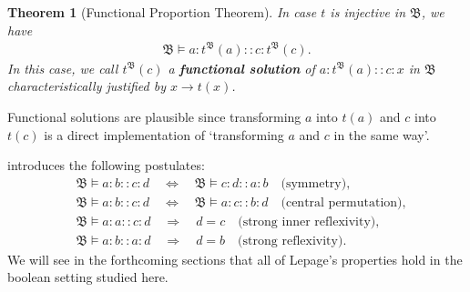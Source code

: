 \documentclass[11pt]{amsart}
\newtheorem{theorem}{Theorem}
\theoremstyle{definition} %
\begin{document}
\begin{theorem}[Functional Proportion Theorem]\label{t:FPT} In case $t$ is injective in $\mathfrak B$, we have
\begin{align*} 
	\mathfrak B\models a: t^\mathfrak B(a)::c: t^\mathfrak B(c).
\end{align*} In this case, we call $ t^\mathfrak B(c)$ a \textit{\textbf{functional solution}} of $a: t^\mathfrak B(a)::c:x$ in $\mathfrak B$ characteristically justified by $x\to t(x)$.
\end{theorem}

Functional solutions are plausible since transforming $a$ into $ t(a)$ and $c$ into $ t(c)$ is a direct implementation of `transforming $a$ and $c$ in the same way'.


 introduces the following postulates:
\begin{align}
	&\mathfrak B\models a:b::c:d\quad\Leftrightarrow\quad \mathfrak B\models c:d::a:b\quad\text{(symmetry)},\\
	\label{equ:central_permutation} &\mathfrak B\models a:b::c:d\quad\Leftrightarrow\quad \mathfrak B\models a:c::b:d\quad\text{(central permutation)},\\
	\label{equ:strong_inner_reflexivity} &\mathfrak B\models a:a::c:d\quad\Rightarrow\quad d=c\quad\text{(strong inner reflexivity)},\\
	\label{equ:strong_reflexivity} &\mathfrak B\models a:b::a:d\quad\Rightarrow\quad d=b\quad\text{(strong reflexivity)}.
\end{align} We will see in the forthcoming sections that all of Lepage's properties hold in the boolean setting studied here.
\end{document}
